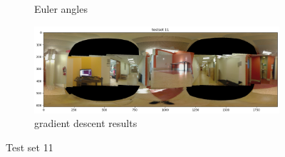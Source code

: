 \documentclass[conference]{IEEEtran}
\begin{document}
\begin{figure}[h]
\begin{subfigure}{0.4\textwidth}
        \caption{Euler angles}
    \end{subfigure}
    \begin{subfigure}{0.4\textwidth}
        \includegraphics[width=\linewidth]{../img/pano_11_gd.png}
        \caption{gradient descent results}
    \end{subfigure}
    \caption{Test set 11}
    \label{fig:set11}
\end{figure}
\end{document}
